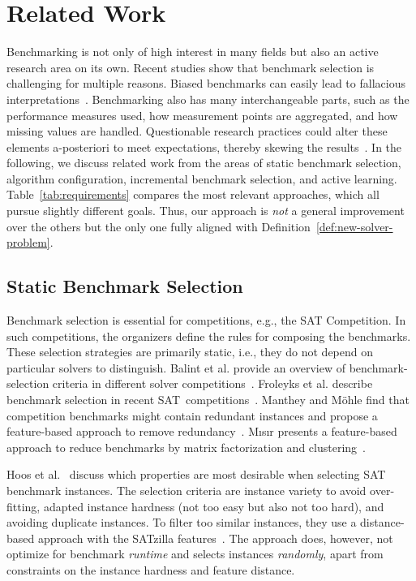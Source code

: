 \documentclass[sn-basic, Numbered]{sn-jnl} %
\begin{document}
\section{Related Work}


Benchmarking is not only of high interest in many fields but also an active research area on its own.
Recent studies show that benchmark selection is challenging for multiple reasons.
Biased benchmarks can easily lead to fallacious interpretations~\cite{abs-2107-07002}.
Benchmarking also has many interchangeable parts, such as the performance measures used, how measurement points are aggregated, and how missing values are handled.
Questionable research practices could alter these elements a-posteriori to meet expectations, thereby skewing the results~\cite{NiesslHWCB22}.
In the following, we discuss related work from the areas of static benchmark selection, algorithm configuration, incremental benchmark selection, and active learning.
Table~\ref{tab:requirements} compares the most relevant approaches, which all pursue slightly different goals.
Thus, our approach is \emph{not} a general improvement over the others but the only one fully aligned with Definition~\ref{def:new-solver-problem}.

\subsection{Static Benchmark Selection}

Benchmark selection is essential for competitions, e.g., the SAT Competition.
In such competitions, the organizers define the rules for composing the benchmarks.
These selection strategies are primarily static, i.e., they do not depend on particular solvers to distinguish.
Balint et al. provide an overview of benchmark-selection criteria in different solver competitions~\cite{balint2015overview}.
Froleyks et al. describe benchmark selection in recent SAT~competitions~\cite{FroleyksHIJS21}.
Manthey and Möhle find that competition benchmarks might contain redundant instances and propose a feature-based approach to remove redundancy~\cite{manthey2016better}.
M{\i}s{\i}r presents a feature-based approach to reduce benchmarks by matrix factorization and clustering~\cite{misir2021benchmark}.

Hoos et al.~\cite{HoosKSS13} discuss which properties are most desirable when selecting SAT benchmark instances.
The selection criteria are instance variety to avoid over-fitting, adapted instance hardness (not too easy but also not too hard), and avoiding duplicate instances.
To filter too similar instances, they use a distance-based approach with the SATzilla features~\cite{XuHHL08,features}.
The approach does, however, not optimize for benchmark \emph{runtime} and selects instances \emph{randomly}, apart from constraints on the instance hardness and feature distance.
\end{document}
